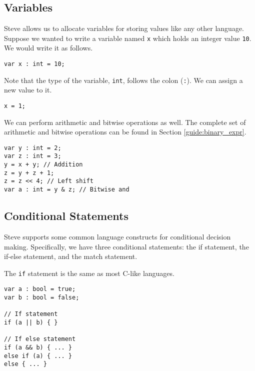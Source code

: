 \subsection{Variables} \label{tut:variable}

Steve allows us to allocate variables for storing values like any other language. Suppose we wanted to write a variable named \texttt{x} which holds an integer value \texttt{10}. We would write it as follows.

\begin{codepage}
\begin{lstlisting}
var x : int = 10;
\end{lstlisting}
\end{codepage}

Note that the type of the variable, \texttt{int}, follows the colon (\texttt{:}). We can assign a new value to it.

\begin{codepage}
\begin{lstlisting}
x = 1;
\end{lstlisting}
\end{codepage}

We can perform arithmetic and bitwise operations as well. The complete set of arithmetic and bitwise operations can be found in Section \ref{guide:binary_expr}.

\begin{codepage}
\begin{lstlisting}
var y : int = 2;
var z : int = 3;
y = x + y; // Addition
z = y + z + 1;
z = z << 4; // Left shift
var a : int = y & z; // Bitwise and
\end{lstlisting}
\end{codepage}


\subsection{Conditional Statements} \label{tut:condition}

Steve supports some common language constructs for conditional decision making. Specifically, we have three conditional statements: the if statement, the if-else statement, and the match statement.

The \texttt{if} statement is the same as most C-like languages.

\begin{codepage}
\begin{lstlisting}
var a : bool = true;
var b : bool = false;

// If statement
if (a || b) { }

// If else statement
if (a && b) { ... }
else if (a) { ... }
else { ... }
\end{lstlisting}
\end{codepage}


